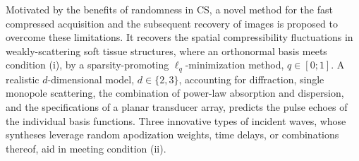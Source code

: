 Motivated by
the benefits of
randomness in
\ac{CS},
a novel method for
the fast compressed acquisition and
the subsequent recovery of
images is proposed to overcome
these limitations.
It recovers
the spatial compressibility fluctuations in
weakly-scattering soft tissue structures, where
an orthonormal basis meets
condition (i), by
a sparsity-promoting $\ell_{q}$-minimization method,
$q \in [ 0; 1 ]$.
A realistic $d$-dimensional model, $d \in \{ 2, 3 \}$, accounting for
diffraction,
single monopole scattering,
the combination of
power-law absorption and
dispersion, and
the specifications of
a planar transducer array, predicts
the pulse echoes of
the individual basis functions.
Three innovative types of
incident waves, whose
syntheses leverage
random apodization weights,
time delays, or
combinations thereof, aid in meeting
condition (ii).

